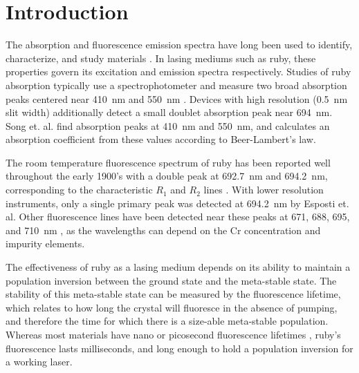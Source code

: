 \documentclass[11pt, a4paper, twocolumn]{article}
\begin{document}

\twocolumn[
  \begin{@twocolumnfalse}
    \maketitle
    \begin{abstract}
      \abstractText
      \newline
      \newline
    \end{abstract}
  \end{@twocolumnfalse}
]


\section*{Introduction}
The absorption and fluorescence emission spectra have long been used to identify, characterize, and study materials \cite{BrittanicaSpectroscopy}. In lasing mediums such as ruby, these properties govern its excitation and emission spectra respectively. Studies of ruby absorption typically use a spectrophotometer and measure two broad absorption peaks centered near \SI{410}{\nm} and \SI{550}{\nm} \cite{Esposti,Kusuma,Song}. Devices with high resolution (\SI{0.5}{\nm} slit width) additionally detect a small doublet absorption peak near \SI{694}{\nm}. Song et. al. find absorption peaks at \SI{410}{\nm} and \SI{550}{\nm}, and calculates an absorption coefficient from these values according to Beer-Lambert's law.

The room temperature fluorescence spectrum of ruby has been reported well throughout the early 1900's with a double peak at \SI{692.7}{\nm} and \SI{694.2}{\nm}, corresponding to the characteristic $R_1$ and $R_2$ lines \cite{Kumari, Mani}. With lower resolution instruments, only a single primary peak was detected at \SI{694.2}{\nm} by Esposti et. al. Other fluorescence lines have been detected near these peaks at 671, 688, 695, and \SI{710}{\nm} \cite{Kusuma}, as the wavelengths can depend on the Cr concentration and impurity elements.

The effectiveness of ruby as a lasing medium depends on its ability to maintain a population inversion between the ground state and the meta-stable state. The stability of this meta-stable state can be measured by the fluorescence lifetime, which relates to how long the crystal will fluoresce in the absence of pumping, and therefore the time for which there is a size-able meta-stable population. Whereas most materials have nano or picosecond fluorescence lifetimes \cite{Berezin}, ruby’s fluorescence lasts milliseconds, and long enough to hold a population inversion for a working laser.
\end{document}
